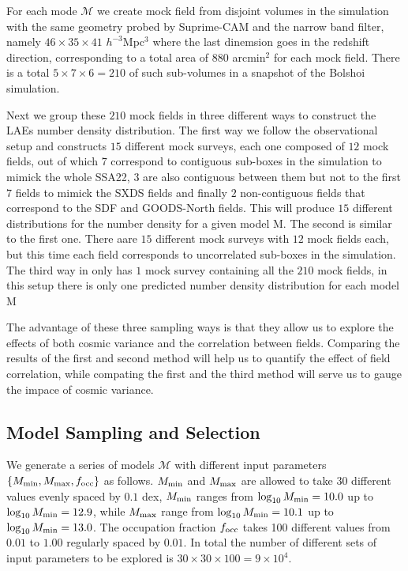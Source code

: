 \documentclass{emulateapj}
\begin{document}
For each mode ${\mathcal M}$ we create mock field from disjoint
volumes in the simulation with the same geometry probed by Suprime-CAM
and the narrow band filter, namely $46\times 35\times 41$
$h^{-3}$Mpc$^{3}$ where the last dinemsion goes in the redshift
direction, corresponding to a total area of $880$ arcmin$^{2}$ for
each mock field. There is a total $5\times 7 \times 6=210$ of such
sub-volumes in a snapshot of the Bolshoi simulation.  

Next we group these $210$ mock fields in three different ways to
construct the LAEs number density distribution. The first way we
follow the observational setup and constructs $15$ different mock
surveys, each one composed of $12$ mock fields, out of which $7$
correspond to contiguous sub-boxes in the simulation to mimick the
whole SSA22, $3$ are also contiguous between them but not to the first
$7$ fields to mimick the SXDS fields and finally $2$ non-contiguous
fields that correspond to the SDF and GOODS-North fields. This will
produce $15$ different distributions for the number density for a
given model ${\mathrm M}$. The second is similar to the first
one. There aare $15$ different mock surveys with $12$ mock fields
each, but this time each field corresponds to uncorrelated sub-boxes
in the simulation. The third way in only has $1$ mock survey
containing all the $210$ mock fields, in this setup there is only one
predicted number density distribution for each model ${\mathrm M}$ 

The advantage of these three sampling ways is that they allow us to
explore the effects of both cosmic variance and the correlation
between fields. Comparing the results of the first and second method
will help us to quantify the effect of field correlation, while
compating the first and the third method will serve us to gauge the
impace of cosmic variance. 


\subsection{Model Sampling and Selection}

We generate a series of models ${\mathcal M}$ with different input
parameters$\{M_{\rm min}, M_{\rm max}, f_{\rm occ}\}$ as
follows. $M_{\rm min}$ and $M_{\rm max}$ are allowed to take 30
different values evenly spaced by $0.1$ dex, $M_{\rm min}$ ranges from
$\log_{10}M_{\rm min}=10.0$ up to $\log_{10}M_{\rm min}=12.9$, while
$M_{\rm max}$ range  from $\log_{10}M_{\rm min}=10.1$ up to
$\log_{10}M_{\rm min}=13.0$. The occupation fraction $f_{\rm occ}$
takes 100 different values from $0.01$ to $1.00$ regularly spaced by
$0.01$. In total the number of different sets of input parameters to
be explored is $30 \times 30\times 100 = 9\times 10^{4}$. 
\end{document}
